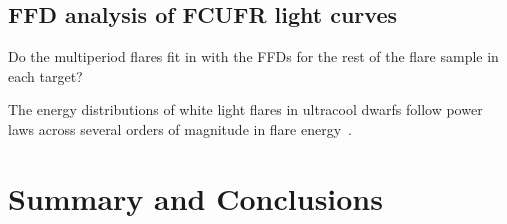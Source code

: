 \documentclass[fleqn,usenatbib,letters]{mnras}%
\begin{document}
\subsection{FFD analysis of FCUFR light curves}

Do the multiperiod flares fit in with the FFDs for the rest of the flare sample in each target?

The energy distributions of white light flares in ultracool dwarfs follow power laws across several orders of magnitude in flare energy~\citep{gizis2017b, paudel2018}.
%
\section{Summary and Conclusions}
\label{sec:summary}
\end{document}

